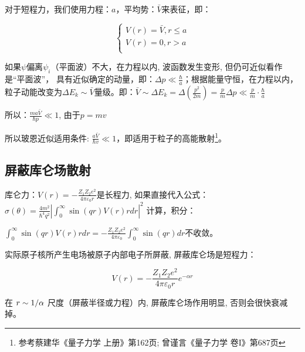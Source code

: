 对于短程力，我们使用力程：$a$，平均势：$\bar V$来表征，即：

\begin{equation}\label{27-7}
\left\{ \begin{array}{l}
 V(r) = \bar V,r \le a \\
 V(r) = 0,r > a \\
 \end{array} \right.
\end{equation}


如果$\psi$偏离$\psi_i$（平面波）不大，在力程以内, 波函数发生变形,
但仍可近似看作是``平面波''， 具有近似确定的动量，即：$\Delta p \ll
\frac{\hbar }{a}$；根据能量守恒，在力程以内，粒子动能改变为$\Delta
E_k  \sim \bar V$量级。即：$\bar V \sim \Delta E_k  = \Delta \left(
{\frac{{p^2 }}{{2m}}} \right) = \frac{p}{m}\Delta p \ll \frac{p}{m}
\cdot \frac{\hbar }{a}$

所以：$\frac{{ma\bar V}}{{\hbar p}} \ll 1$, 由于$p = mv$


所以玻恩近似适用条件: $\frac{{a\bar V}}{{\hbar v}} \ll
1$，即适用于粒子的高能散射\footnote{参考蔡建华《量子力学
上册》第162页; 曾谨言《量子力学 卷I》第687页}。

\subsection{屏蔽库仑场散射}



库仑力：$V(r) =  - \frac{{Z_1 Z_2 e^2 }}{{4\pi \varepsilon _0
r}}$是长程力, 如果直接代入公式：$\sigma (\theta ) = \frac{{4m^2
}}{{\hbar ^4 q^2 }}\left| {\int_0^\infty  {\sin (qr)V(r)rdr} }
\right|^2 $ 计算，积分：

$\int_0^\infty  {\sin (qr)V(r)rdr}  =  -
\frac{{Z_1 Z_2 e^2 }}{{4\pi \varepsilon _0 }}\int_0^\infty  {\sin
(qr)} dr$不收敛。



实际原子核所产生电场被原子内部电子所屏蔽, 屏蔽库仑场是短程力：


\begin{equation}\label{screened coulomb potential}
V(r) = - \frac{{Z_1 Z_2 e^2 }}{{4\pi \varepsilon _0 r}}e^{ - \alpha
r}
\end{equation}


在 $r \sim {1 \mathord{\left/
 {\vphantom {1 \alpha }} \right.
 \kern-\nulldelimiterspace} \alpha }$ 尺度（屏蔽半径或力程）内, 屏蔽库仑场作用明显, 否则会很快衰减掉。



